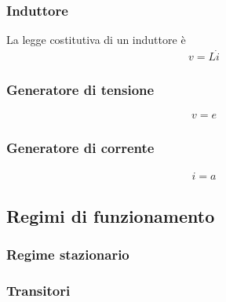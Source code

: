 \documentclass[letterpaper,10pt,italian]{jupyterBook}
\begin{document}
\subsubsection{Induttore}
\label{\detokenize{ch/electromagnetism/circuits-electric:induttore}}
\sphinxAtStartPar
La legge costitutiva di un induttore è
\begin{equation*}
\begin{split}v = L \dot{i}\end{split}
\end{equation*}

\subsubsection{Generatore di tensione}
\label{\detokenize{ch/electromagnetism/circuits-electric:generatore-di-tensione}}\begin{equation*}
\begin{split}v = e\end{split}
\end{equation*}

\subsubsection{Generatore di corrente}
\label{\detokenize{ch/electromagnetism/circuits-electric:generatore-di-corrente}}\begin{equation*}
\begin{split}i = a\end{split}
\end{equation*}

\subsection{Regimi di funzionamento}
\label{\detokenize{ch/electromagnetism/circuits-electric:regimi-di-funzionamento}}

\subsubsection{Regime stazionario}
\label{\detokenize{ch/electromagnetism/circuits-electric:regime-stazionario}}

\subsubsection{Transitori}
\label{\detokenize{ch/electromagnetism/circuits-electric:transitori}}
\end{document}
